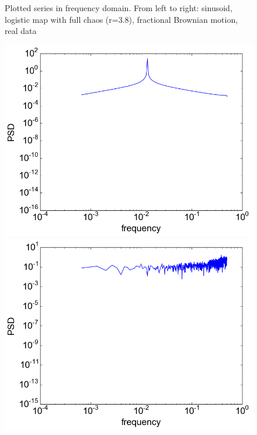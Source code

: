 \documentclass[12pt]{article}
\begin{document}
\begin{figure}
\begin{center}
  \end{center}
  \caption{Plotted series in frequency domain. From left to right: sinusoid, logistic map with full chaos (r=3.8), fractional Brownian motion, real data}
\end{figure}
\begin{figure}\label{fig:stack_ts_degree}
  \begin{center}
    \includegraphics[scale=0.6]{spectrum_sinusoid}
    \includegraphics[scale=0.6]{spectrum_logistic}

\end{center}
\end{figure}
\end{document}
